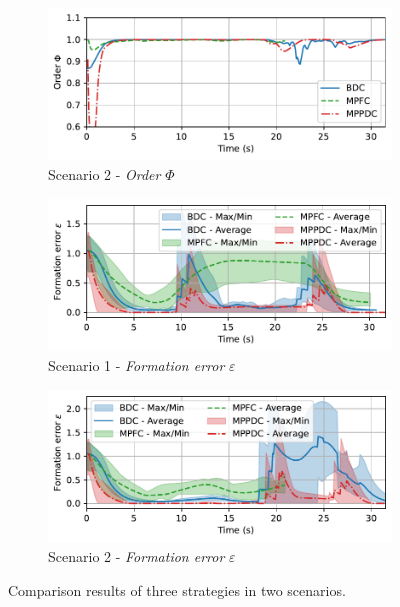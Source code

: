 \begin{figure}[h!]
    \begin{subfigure}[b]{0.495\textwidth}
    \includegraphics[width=\textwidth]{paper3/images/order_scen2.pdf}
    \caption{Scenario 2 - \textit{Order} $\Phi$}
    \label{fig:order2}
    \end{subfigure}
    \begin{subfigure}[b]{0.495\textwidth}
    \includegraphics[width=\textwidth]{paper3/images/error_scen1.pdf}
    \caption{Scenario 1 - \textit{Formation error} $\varepsilon$}
    \label{fig:error1}
    \end{subfigure}
    \begin{subfigure}[b]{0.495\textwidth}
    \includegraphics[width=\textwidth]{paper3/images/error_scen2.pdf}
    \caption{Scenario 2 - \textit{Formation error} $\varepsilon$}
    \label{fig:errorr2}
    \end{subfigure}
    \caption{Comparison results of three strategies in two scenarios.}
    \label{fig:comparison}
\end{figure}

